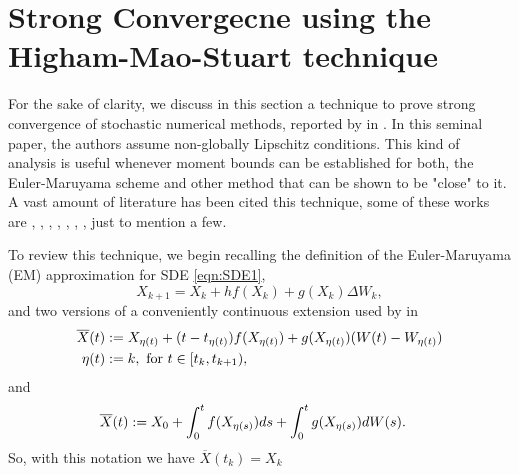 \documentclass[3p]{elsarticle}
\theoremstyle{definition}
\theoremstyle{plain}%
\theoremstyle{remark}
\begin{document}
\section{Strong Convergecne using the Higham-Mao-Stuart technique} 

	For the sake of clarity,  we discuss in this section a technique to prove strong convergence of stochastic
numerical methods, reported  by  \citeauthor*{Higham2002b} in \cite{Higham2002b}.
In this seminal paper, the authors assume non-globally Lipschitz conditions.
This kind of analysis is useful whenever moment bounds can be established for both, the Euler-Maruyama scheme and 
other method that can be shown to be "close" to it. A vast amount of literature has been cited this 
technique, some of these works are
\cite{Beyn2010}, 
\cite{Guo2014}, 
\cite{Hutzenthaler2015}, 
\cite{Hutzenthaler2012a}, 
\cite{Hutzenthaler2010}
\cite{Lamba2007}, 
\cite{Mao2013}, 
\cite{Tretyakov2013}, 
just to mention a few.

	To review this technique, we begin  recalling the definition of the Euler-Maruyama (EM) approximation for SDE 
\eqref{eqn:SDE1}, %
\begin{equation}\label{eqn:EulerMaruyamaHigham}
	X_{k+1}= X_k+
		hf(X_k) + g(X_k)\Delta W_k,
\end{equation}
and two versions of a conveniently continuous extension used by
\citeauthor{Higham2002b} in \cite{Higham2002b} 
\begin{align}\label{eqn:EMContinuousExtension}
	\overline{X}(t)&:=
		X_{\eta(t)} + (t-t_{\eta(t)}) f(X_{\eta(t)}) + g(X_{\eta(t)})(W(t)-W_{\eta(t)})\\
		\eta(t)&:=
			 k, \text{ for } t\in[t_k,t_{k+1}), \notag
\end{align}
and
\begin{align}
		\overline{X}(t)
		&:=
			X_0 + \int_{0}^t f(X_{\eta(s)})ds + 
			\int_0^tg(X_{\eta(s)})dW(s). \notag \label{eqn:EMIntegralContinuousExtension}
	\end{align}
So, with this notation we have $\overline{X}(t_k)=X_k$%
%
\end{document}
